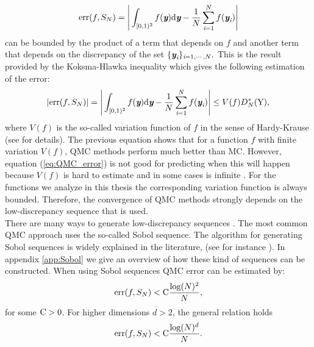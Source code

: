 \begin{equation}
\textrm{err}(f, S_{N}) =\Bigg|\int_{[0,1)^2}f(\textit{\textbf{y}}) \textrm{d}\textit{\textbf{y}}-\frac{1}{N}\sum_{\textit{i}=1}^{N}f(\textit{\textbf{y}}_{\textit{i}})\Bigg|
\end{equation}
 can be bounded by the product of a term that depends on $f$ and another term that depends on the discrepancy of the set $\{\textit{\textbf{y}}_{\textit{i}}\}_{\textit{i}=1, \cdots, N}.$ This is the result provided by the Koksma-Hlawka inequality which gives the following estimation of the error:
\begin{equation}\label{eq:QMC_error}
|\textrm{err}(f, S_{N})|= \Bigg|\int_{[0,1)^2}f(\textit{\textbf{y}}) \textrm{d}\textit{\textbf{y}}-\frac{1}{N}\sum_{\textit{i}=1}^{N}f(\textit{\textbf{y}}_{\textit{i}})\Bigg|\leq V(f)D^*_N(\mbox{$\textup{Y}$}),
\end{equation}
where $V(f)$ is the so-called variation function of $f$ in the sense of Hardy-Krause (see \cite{brandolini2013koksma} for details). 
The previous equation shows that for a function $f$ with finite variation $V(f)$, QMC methods perform much better than MC. However, equation (\ref{eq:QMC_error}) is not good for predicting when this will happen because $V(f)$ is hard to estimate and in some cases is infinite \cite{wang2008low}. 
For the functions we analyze in this thesis the corresponding variation function is always bounded. 
Therefore, the convergence of QMC methods strongly depends on the low-discrepancy sequence that is used.\\ \indent
There are many ways to generate low-discrepancy sequences \cite{dalal2008low}. The most common QMC approach uses the so-called Sobol sequence. The algorithm for generating Sobol sequences is widely explained in the literature, (see for instance \cite{bratley1988algorithm}). In appendix \ref{app:Sobol} we give an overview of how these kind of sequences can be constructed. When using Sobol sequences QMC error can be estimated by:
\begin{equation}
\textrm{err}(f, S_{N})<\textrm{C} \frac{\log(N)^2}{N}, 
\end{equation}
for some $\textrm{C}>0$.
For higher dimensions $d>2$, the general relation holds
\begin{equation}
\textrm{err}(f, S_N)<\textrm{C} \frac{\log(N)^d}{N}.
\end{equation}
